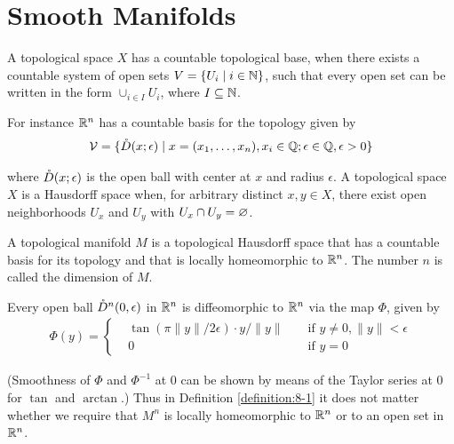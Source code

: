 \chapter{Smooth Manifolds}
A topological space $X$ has a countable topological base, when there exists a
countable system of open sets $V = \{U_i\mid i\in {\ensuremath{\mathbb{N}}}\}$, such that every open set can be
written in the form $\cup_{i\in I}U_i$, where $I\subseteq{\ensuremath{\mathbb{N}}}$.

For instance ${\mathbb{R}}^n$ has a countable basis for the topology given by
\begin{align*}
  \mathcal{V} = \{\mathring{D}(x;\epsilon)\mid x=(x_1, \ldots, x_n), x_i\in {\ensuremath{\mathbb{Q}}}; \epsilon\in{\ensuremath{\mathbb{Q}}}, \epsilon>0\}
\end{align*}

where $\mathring{D}(x;\epsilon)$ is the open ball with center at $x$ and radius $\epsilon$.
A topological space $X$ is a Hausdorff space when, for arbitrary distinct $x,y\in X$,
there exist open neighborhoods $U_x$ and $U_y$ with $U_x\cap U_y=\varnothing$.

\begin{definition}\label{definition:8-1}
  A topological manifold $M$ is a topological Hausdorff space that
  has a countable basis for its topology and that is locally homeomorphic to ${\mathbb{R}}^n$.
  The number $n$ is called the dimension of $M$.
\end{definition}

\begin{remark}\label{remark:8-2}
  Every open ball $\mathring{D}^n(0, \epsilon)$ in ${\mathbb{R}}^n$ is diffeomorphic to ${\mathbb{R}}^n$ via the map
  $\Phi$, given by
  \begin{align*}
    \Phi(y) = \left\{\begin{aligned}
      & \tan(\pi\|y\|/2\epsilon)\cdot y/\|y\| && \text{ if } y\neq 0, \|y\|<\epsilon \\
      & 0 && \text{ if } y = 0
    \end{aligned}\right.
  \end{align*}

  (Smoothness of $\Phi$ and $\Phi^{-1}$ at 0 can be shown by means of the Taylor series at 0
  for $\tan$ and $\arctan$.) Thus in Definition \ref{definition:8-1} it does not matter whether we require
  that $M^n$ is locally homeomorphic to ${\mathbb{R}}^n$ or to an open set in ${\mathbb{R}}^n$.
\end{remark}


